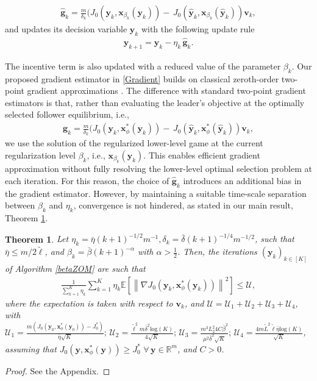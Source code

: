 \documentclass[letterpaper, 10 pt, conference]{ieeeconf}
\newcommand{\real}{\mathbb{R}}
\newcommand\gbf{\mathbf{g}}
\newcommand\vbf{\mathbf{v}}
\newcommand\xbf{\mathbf{x}}
\newcommand\ybf{\mathbf{y}}
\newtheorem{theorem}{Theorem}
\begin{document}
\begin{align}\label{Gradient}
    \hat{\gbf}_k=\frac{m}{\delta_k}(J_0(\ybf_k,\xbf_{\beta_k}(\ybf_k))- \,J_0(\hat{\ybf}_k,\xbf_{\beta_k}(\hat{\ybf}_k))\vbf_k,
\end{align}
and updates its decision variable $\ybf_{k}$ with the following update rule
\begin{align}
    \ybf_{k+1}=\ybf_k-\eta_k\,\hat{\gbf}_k.
\end{align} 

The incentive term is also updated with a reduced value of the parameter $\beta_k$. 
Our proposed gradient estimator in \eqref{Gradient} builds on classical zeroth-order two-point gradient approximations \cite{nesterov2017random}. The difference with standard two-point gradient estimators \cite[Eq. 30]{nesterov2017random} is that, rather than evaluating the leader’s objective at the optimally selected follower equilibrium, i.e., 
\begin{align}\label{GradientVero}
    \gbf_k=\frac{m}{\delta_k}(J_0(\ybf_k,\xbf^*_\phi(\ybf_k))- \,J_0(\hat{\ybf}_k,\xbf^*_{\phi}(\hat{\ybf}_k))\vbf_k,
\end{align}
we use the solution of the regularized lower-level game at the current regularization level $\beta_k$, i.e., $\xbf_{\beta_k}(\ybf_k)$. This enables efficient gradient approximation without fully resolving the lower-level optimal selection problem at each iteration. For this reason, the choice of $\hat{\gbf}_k$ introduces an additional bias in the gradient estimator. However, by maintaining a suitable time-scale separation between $\beta_k$ and $\eta_k$, convergence is not hindered, as stated in our main result, Theorem \ref{BoundZOM}.
\begin{theorem}\label{BoundZOM}
Let $\eta_k=\bar{\eta}(k+1)^{-1/2}m^{-1}, \delta_k=\bar{\delta}(k+1)^{-1/4}m^{-1/2}$, such that $\bar{\eta}\le m/2 \tilde{\ell}$, and $\beta_k=\bar{\beta}(k+1)^{-\alpha}$ with $\alpha > \frac{1}{2}$. Then, the iterations $\left(\ybf_k\right)_{k \in [K]}$ of Algorithm \ref{betaZOM} are such that
    \begin{align}\label{Bound}
        \frac{1}{\sum_{k=1}^K \eta_k} \sum_{k=1}^K \eta_k \mathbb{E}\left[\left\|\nabla J_0(\ybf_k,\xbf^*_\phi(\ybf_k))\right\|^2\right]\le \mathcal{U},
    \end{align}
    where the expectation is taken with respect to $\vbf_k$, and $\mathcal{U}=\mathcal{U}_1+ \mathcal{U}_2+ \mathcal{U}_3+ \mathcal{U}_4$, with $\mathcal{U}_1=\frac{m (J_0(\ybf_0,\xbf^*_\phi(\ybf_0))-{J}_0^*)}{\bar{\eta}\sqrt{K}};\, \mathcal{U}_2=\frac{\tilde{\ell}^2m \bar{\delta}^2 \mathrm{log}(K)}{4 \sqrt{K}}; \, \mathcal{U}_3=\frac{m^3L_2^2 4 C\bar{\beta}^2}{\mu^2\bar{\delta}^2 \sqrt{K}};\,\mathcal{U}_4=\frac{4m\tilde{L}^2\tilde{\ell}\bar{\eta}\mathrm{log}(K)}{\sqrt{K}}$, assuming that $J_0(\ybf,\xbf^*_\phi(\ybf))\ge J^*_0 \,\,\forall \, \ybf \in \real^m$, and $C >0$.
\end{theorem}
\begin{proof}
   See the Appendix.
\end{proof}
\end{document}
